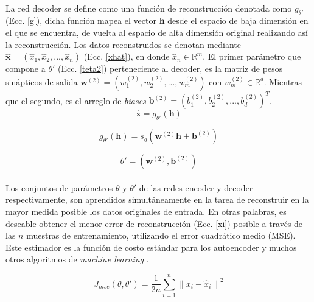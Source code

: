 \documentclass[12pt]{article}
\begin{document}
\paragraph{}
La red decoder se define como una función de reconstrucción denotada como $g_{\theta'}$ (Ecc. \ref{g}), dicha función mapea el vector $\textbf{h}$ desde el espacio de baja dimensión en el que se encuentra, de vuelta al espacio de alta dimensión original realizando así la reconstrucción. Los datos reconstruidos se denotan mediante $\hat{\textbf{x}}=(\hat{x}_{1},\hat{x}_{2},...,\hat{x}_{n})$ (Ecc. \ref{xhat}), en donde $\hat{x}_{n}\in \mathbb{R}^{m}$. El primer parámetro que compone a $\theta'$ (Ecc. \ref{teta2}) perteneciente al decoder, es la matriz de pesos sinápticos de salida $\textbf{w}^{(2)} = (w_{1}^{(2)},w_{2}^{(2)},...,w_{m}^{(2)})$ con $w_{m}^{(2)}\in \mathbb{R}^{d}$. Mientras que el segundo, es el arreglo de \textit{biases} $\textbf{b}^{(2)}=(b_{1}^{(2)},b_{2}^{(2)},...,b_{d}^{(2)})^T$. 
\begin{equation}
\label{xhat}
\hat{\textbf{x}}=g_{\theta'}(\textbf{h})
\end{equation}

\begin{equation}
\label{g}
g_{\theta'}(\textbf{h})=s_{g}(\textbf{w}^{(2)}\textbf{h}+\textbf{b}^{(2)})
\end{equation}

\begin{equation}
\label{teta2}
\theta'=(\textbf{w}^{(2)},\textbf{b}^{(2)})
\end{equation}

\paragraph{}
Los conjuntos de parámetros $\theta$ y $\theta'$ de las redes encoder y decoder respectivamente, son aprendidos simultáneamente en la tarea de reconstruir en la mayor medida posible los datos originales de entrada. En otras palabras, es deseable obtener el menor error de reconstrucción (Ecc. \ref{xi}) posible a través de las $n$ muestras de entrenamiento, utilizando el error cuadrático medio (MSE). Este estimador es la función de costo estándar para los autoencoder y muchos otros algoritmos de \textit{machine learning} \cite{mining}.

\begin{equation}
\label{xi}
J_{mse}(\theta,\theta')=\frac{1}{2n}\sum_{i=1}^{n}{\|x_{i}-\hat{x}_{i}\|}^2
\end{equation}
\end{document}
